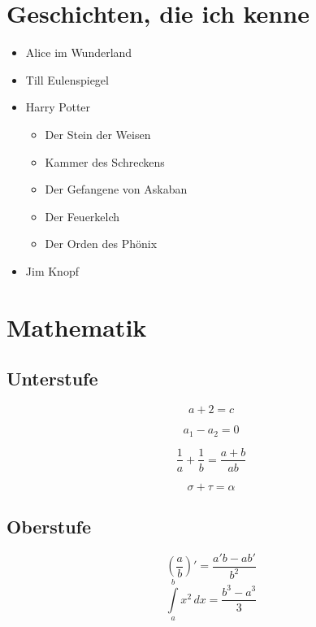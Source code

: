 \documentclass[11pt]{scrartcl}
\begin{document}
\section{Geschichten, die ich kenne}
\label{sec:geschichten-die-ich}

\begin{itemize}
\item Alice im Wunderland
\item Till Eulenspiegel
\item Harry Potter
  \begin{itemize}
  \item Der Stein der Weisen
  \item Kammer des Schreckens
  \item Der Gefangene von Askaban
  \item Der Feuerkelch
  \item Der Orden des Phönix
  \end{itemize}
\item Jim Knopf
\end{itemize}

\section{Mathematik}
\label{sec:mathematik}

\subsection{Unterstufe}
\label{sec:unterstufe}

\begin{equation*}
  a + 2 = c
\end{equation*}

\begin{equation*}
  a_{1} - a_{2} = 0
\end{equation*}

\begin{equation*}
  \frac{1}{a} + \frac{1}{b} = \frac{a+b}{ab}
\end{equation*}

\begin{equation*}
  \sigma + \tau = \alpha
\end{equation*}
\subsection{Oberstufe}
\label{sec:oberstufe}

\begin{equation}
  \label{eq:1}
  \left( \frac{a}{b} \right)' = \frac{a'b-ab'}{b^{2}}
\end{equation}
\begin{equation}
  \label{eq:2}
  \int\limits_{a}^{b} x^{2}\,dx = \frac{b^{3} - a^{3}}{3}
\end{equation}
\end{document}
